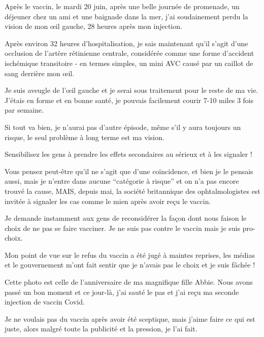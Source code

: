 Après le vaccin, le mardi 20 juin, après une belle journée de promenade, un
déjeuner chez un ami et une baignade dans la mer, j'ai soudainement perdu la
vision de mon œil gauche, 28 heures après mon injection.

Après environ 32 heures d'hospitalisation, je sais maintenant qu'il s'agit d'une
occlusion de l'artère rétinienne centrale, considérée comme une forme d'accident
ischémique transitoire - en termes simples, un mini AVC causé par un caillot de
sang derrière mon œil.

Je suis aveugle de l'œil gauche et je serai sous traitement pour le reste de ma
vie. J'étais en forme et en bonne santé, je pouvais facilement courir 7-10 miles
3 fois par semaine.

Si tout va bien, je n'aurai pas d'autre épisode, même s'il y aura toujours un
risque, le seul problème à long terme est ma vision.

Sensibilisez les gens à prendre les effets secondaires au sérieux et à les
signaler !

Vous pensez peut-être qu'il ne s'agit que d'une coïncidence, et bien je le
pensais aussi, mais je n'entre dans aucune “catégorie à risque” et on n'a pas
encore trouvé la cause, MAIS, depuis mai, la société britannique des
ophtalmologistes est invitée à signaler les cas comme le mien après avoir reçu
le vaccin.

Je demande instamment aux gens de reconsidérer la façon dont nous faison le
choix de ne pas se faire vacciner. Je ne suis pas contre le vaccin mais je suis
pro-choix.

Mon point de vue sur le refus du vaccin a été jugé à maintes reprises, les
médias et le gouvernement m'ont fait sentir que je n'avais pas le choix et je
suis fâchée !

Cette photo est celle de l'anniversaire de ma magnifique fille Abbie. Nous avons
passé un bon moment et ce jour-là, j'ai sauté le pas et j'ai reçu ma seconde
injection de vaccin Covid.

Je ne voulais pas du vaccin après avoir été sceptique, mais j'aime faire ce qui
est juste, alors malgré toute la publicité et la pression, je l'ai fait.


